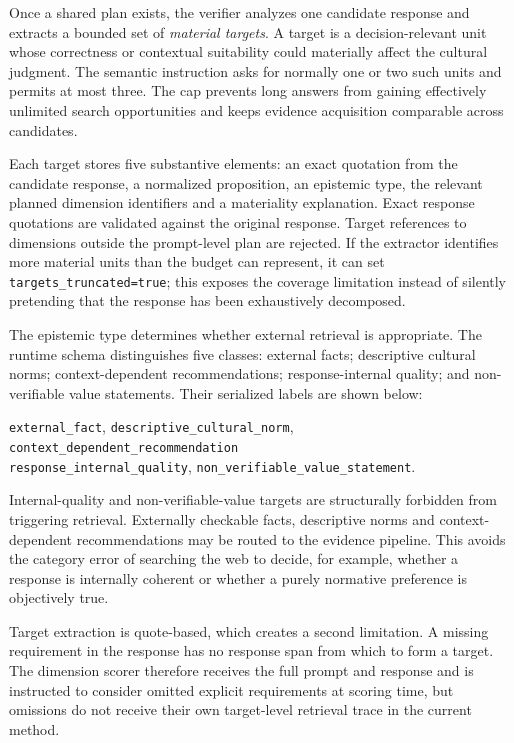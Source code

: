 Once a shared plan exists, the verifier analyzes one candidate response and extracts a bounded set of \emph{material targets}. A target is a decision-relevant unit whose correctness or contextual suitability could materially affect the cultural judgment. The semantic instruction asks for normally one or two such units and permits at most three. The cap prevents long answers from gaining effectively unlimited search opportunities and keeps evidence acquisition comparable across candidates.

Each target stores five substantive elements: an exact quotation from the candidate response, a normalized proposition, an epistemic type, the relevant planned dimension identifiers and a materiality explanation. Exact response quotations are validated against the original response. Target references to dimensions outside the prompt-level plan are rejected. If the extractor identifies more material units than the budget can represent, it can set \texttt{targets\_truncated=true}; this exposes the coverage limitation instead of silently pretending that the response has been exhaustively decomposed.

The epistemic type determines whether external retrieval is appropriate. The runtime schema distinguishes five classes: external facts; descriptive cultural norms; context-dependent recommendations; response-internal quality; and non-verifiable value statements. Their serialized labels are shown below:
\begin{center}
\small
\texttt{external\_fact}, \texttt{descriptive\_cultural\_norm}, \texttt{context\_dependent\_recommendation}\\
\texttt{response\_internal\_quality}, \texttt{non\_verifiable\_value\_statement}.
\end{center}
Internal-quality and non-verifiable-value targets are structurally forbidden from triggering retrieval. Externally checkable facts, descriptive norms and context-dependent recommendations may be routed to the evidence pipeline. This avoids the category error of searching the web to decide, for example, whether a response is internally coherent or whether a purely normative preference is objectively true.

Target extraction is quote-based, which creates a second limitation. A missing requirement in the response has no response span from which to form a target. The dimension scorer therefore receives the full prompt and response and is instructed to consider omitted explicit requirements at scoring time, but omissions do not receive their own target-level retrieval trace in the current method.

